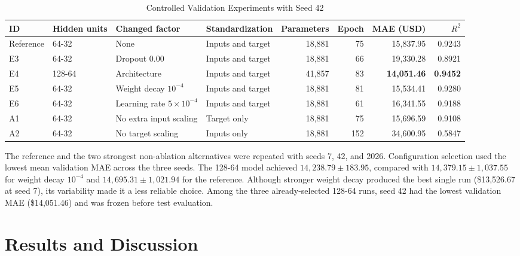 \documentclass[11pt,a4paper]{article}
\begin{document}
\begin{table}[htbp]
\caption{Controlled Validation Experiments with Seed 42}
\label{tab:validation}
\centering
\small
\setlength{\tabcolsep}{3.5pt}
\begin{tabular}{llllrrrr}
\toprule
ID & Hidden units & Changed factor & Standardization & Parameters & Epoch & MAE (USD) & $R^2$ \\
\midrule
Reference & 64-32 & None & Inputs and target & 18,881 & 75 & 15,837.95 & 0.9243 \\
E3 & 64-32 & Dropout 0.00 & Inputs and target & 18,881 & 66 & 19,330.28 & 0.8921 \\
E4 & 128-64 & Architecture & Inputs and target & 41,857 & 83 & \textbf{14,051.46} & \textbf{0.9452} \\
E5 & 64-32 & Weight decay $10^{-4}$ & Inputs and target & 18,881 & 81 & 15,534.41 & 0.9280 \\
E6 & 64-32 & Learning rate $5\times10^{-4}$ & Inputs and target & 18,881 & 61 & 16,341.55 & 0.9188 \\
A1 & 64-32 & No extra input scaling & Target only & 18,881 & 75 & 15,696.59 & 0.9108 \\
A2 & 64-32 & No target scaling & Inputs only & 18,881 & 152 & 34,600.95 & 0.5847 \\
\bottomrule
\end{tabular}
\end{table}

The reference and the two strongest non-ablation alternatives were repeated with seeds 7, 42, and 2026. Configuration selection used the lowest mean validation MAE across the three seeds. The 128-64 model achieved $14,238.79\pm183.95$, compared with $14,379.15\pm1,037.55$ for weight decay $10^{-4}$ and $14,695.31\pm1,021.94$ for the reference. Although stronger weight decay produced the best single run (\$13,526.67 at seed 7), its variability made it a less reliable choice. Among the three already-selected 128-64 runs, seed 42 had the lowest validation MAE (\$14,051.46) and was frozen before test evaluation.

\section{Results and Discussion}
\end{document}
